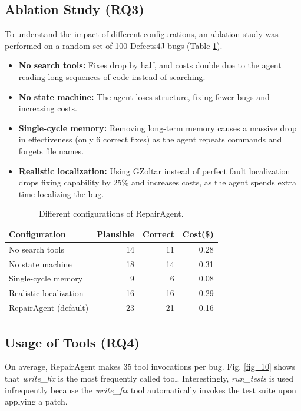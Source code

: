 \documentclass[manuscript,review]{acmart}
\begin{document}
\subsection{Ablation Study (RQ3)}
To understand the impact of different configurations, an ablation study was performed on a random set of 100 Defects4J bugs (Table \ref{tab:ablation}). 
\begin{itemize}
    \item \textbf{No search tools:} Fixes drop by half, and costs double due to the agent reading long sequences of code instead of searching.
    \item \textbf{No state machine:} The agent loses structure, fixing fewer bugs and increasing costs.
    \item \textbf{Single-cycle memory:} Removing long-term memory causes a massive drop in effectiveness (only 6 correct fixes) as the agent repeats commands and forgets file names.
    \item \textbf{Realistic localization:} Using GZoltar \cite{campos2012gzoltar} instead of perfect fault localization drops fixing capability by 25\% and increases costs, as the agent spends extra time localizing the bug.
\end{itemize}

\begin{table}[htbp]
\caption{Different configurations of RepairAgent.}
\label{tab:ablation}
\centering
\small
\begin{tabular}{lrrr}
\toprule
\textbf{Configuration} & \textbf{Plausible} & \textbf{Correct} & \textbf{Cost(\$)} \\
\midrule
No search tools & 14 & 11 & 0.28 \\
No state machine & 18 & 14 & 0.31 \\
Single-cycle memory & 9 & 6 & 0.08 \\
Realistic localization & 16 & 16 & 0.29 \\
RepairAgent (default) & 23 & 21 & 0.16 \\
\bottomrule
\end{tabular}
\end{table}

\subsection{Usage of Tools (RQ4)}
On average, RepairAgent makes 35 tool invocations per bug. Fig. \ref{fig_10} shows that \textit{write\_fix} is the most frequently called tool. Interestingly, \textit{run\_tests} is used infrequently because the \textit{write\_fix} tool automatically invokes the test suite upon applying a patch.
\end{document}
